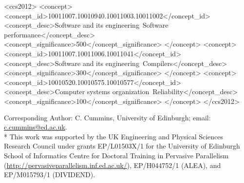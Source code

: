 %
%
\begin{CCSXML}
<ccs2012>
    <concept>
        <concept_id>10011007.10010940.10011003.10011002</concept_id>
        <concept_desc>Software and its engineering~Software performance</concept_desc>
        <concept_significance>500</concept_significance>
    </concept>
    <concept>
        <concept_id>10011007.10011006.10011041</concept_id>
        <concept_desc>Software and its engineering~Compilers</concept_desc>
        <concept_significance>300</concept_significance>
    </concept>
    <concept>
        <concept_id>10010520.10010575.10010577</concept_id>
        <concept_desc>Computer systems organization~Reliability</concept_desc>
        <concept_significance>100</concept_significance>
    </concept>
</ccs2012>
\end{CCSXML}


%
%




\begin{bottomstuff}
  Corresponding Author: C. Cummins, University of Edinburgh; email: \url{c.cummins@ed.ac.uk}.\\*
  This work was supported by the UK Engineering and Physical Sciences
  Research Council under grants EP/L01503X/1 for the University of
  Edinburgh School of Informatics Centre for Doctoral Training in
  Pervasive Parallelism
  (\url{http://pervasiveparallelism.inf.ed.ac.uk/}), EP/H044752/1
  (ALEA), and EP/M015793/1 (DIVIDEND).
\end{bottomstuff}

\maketitle


